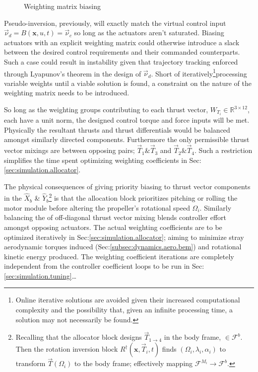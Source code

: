 {\begin{figure}[htbp]
\label{fig:weighted-matrix}
\caption{Weighting matrix biasing}
\vspace{-20pt}
\end{figure}
\par
Pseudo-inversion, previously, will exactly match the virtual control input $\vec{\nu}_d=B(\mathbf{x},u,t)=\vec{\nu}_c$ so long as the actuators aren't saturated. Biasing actuators with an explicit weighting matrix could otherwise introduce a slack between the desired control requirements and their commanded counterparts. Such a case could result in instability given that trajectory tracking enforced through Lyapunov's theorem in the design of $\vec{\nu}_d$. Short of iteratively\footnote{Online iterative solutions are avoided given their increased computational complexity and the possibility that, given an infinite processing time, a solution may not necessarily be found.}processing variable weights until a viable solution is found, a constraint on the nature of the weighting matrix needs to be introduced.
\par
So long as the weighting groups contributing to each thrust vector, $W_{T_i}\in\mathbb{R}^{3\times 12}$, each have a unit norm, the designed control torque and force inputs will be met. Physically the resultant thrusts and thrust differentials would be balanced amongst similarly directed components. Furthermore the only permissible thrust vector mixings are between opposing pairs; $\vec{T}_1\text{\&}\vec{T}_3$ and $\vec{T}_2\text{\&}\vec{T}_4$. Such a restriction simplifies the time spent optimizing weighting coefficients in Sec:\ref{sec:simulation.allocator}.
\par
The physical consequences of giving priority biasing to thrust vector components in the $\hat{X}_b$ \& $\hat{Y}_b$\footnote{Recalling that the allocator block designs $\vec{T}_{1\rightarrow 4}$ in the body frame, $\in\mathcal{F}^b$. Then the rotation inversion block $R^\dagger(\mathbf{x},\vec{T}_i,t)$ finds $(\Omega_i,\lambda_i,\alpha_i)$ to transform $\vec{T}(\Omega_i)$ to the body frame; effectively mapping $\mathcal{F}^{M_i}\rightarrow\mathcal{F}^b$.} is that the allocation block prioritizes pitching or rolling the motor module before altering the propeller's rotational speed $\Omega_i$. Similarly balancing the of off-diagonal thrust vector mixing blends controller effort amongst opposing actuators. The actual weighting coefficients are to be optimized iteratively in Sec:\ref{sec:simulation.allocator}; aiming to minimize stray aerodynamic torques induced (Sec:\ref{subsec:dynamics.aero.bem}) and rotational kinetic energy produced. The weighting coefficient iterations are completely independent from the controller coefficient loops to be run in Sec:\ref{sec:simulation.tuning}\ldots
}
